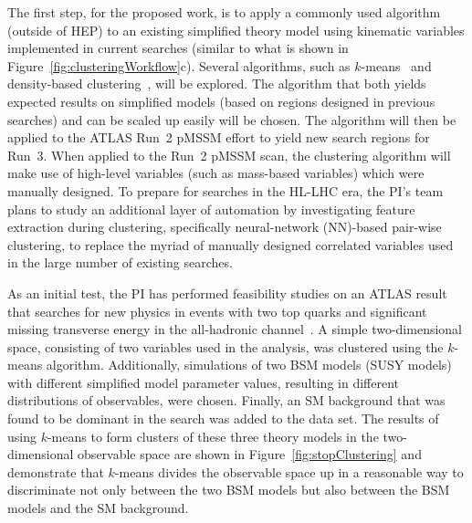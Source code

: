 \documentclass[letter, USenglish, 11pt, subfigure]{article}
\begin{document}
The first step, for the proposed work, is to apply a commonly used algorithm (outside of HEP) to an existing simplified theory model using kinematic variables implemented in current searches (similar to what is shown in Figure~\ref{fig:clusteringWorkflow}c). Several algorithms, such as $k$-means~\cite{kmeans} and density-based clustering~\cite{dbscan}, will be explored. The algorithm that both yields expected results on simplified models (based on regions designed in previous searches) and can be scaled up easily will be chosen. The algorithm will then be applied to the ATLAS Run~2 pMSSM effort to yield new search regions for Run~3. When applied to the Run~2 pMSSM scan, the clustering algorithm will make use of high-level variables (such as mass-based variables) which were manually designed. To prepare for searches in the HL-LHC era, the PI's team plans to study an additional layer of automation by investigating feature extraction during clustering, specifically neural-network (NN)-based pair-wise clustering, to replace the myriad of manually designed correlated variables used in the large number of existing searches. 

As an initial test, the PI has performed feasibility studies on an ATLAS result that searches for new physics in events with two top quarks and significant missing transverse energy in the all-hadronic channel~\cite{stop0L_3}. A simple two-dimensional space, consisting of two variables used in the analysis, was clustered using the $k$-means algorithm. Additionally, simulations of two BSM models (SUSY models) with different simplified model parameter values, resulting in different distributions of observables, were chosen. Finally, an SM background that was found to be dominant in the search was added to the data set. The results of using $k$-means to form clusters of these three theory models in the two-dimensional observable space are shown in Figure~\ref{fig:stopClustering} and demonstrate that $k$-means divides the observable space up in a reasonable way to discriminate not only between the two BSM models but also between the BSM models and the SM background.
\end{document}
